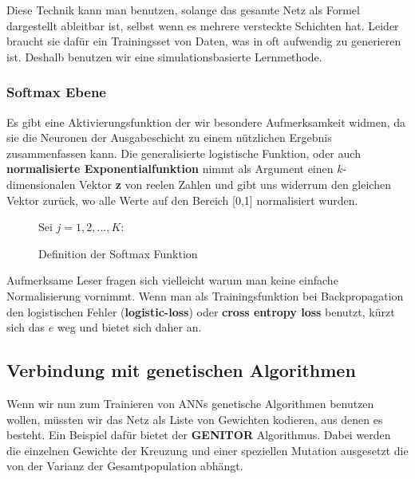                 \noindent
                Diese Technik kann man benutzen, solange das gesamte Netz als Formel dargestellt ableitbar ist, selbst wenn es mehrere versteckte Schichten hat. Leider braucht sie dafür ein Trainingsset von Daten, was in oft aufwendig zu generieren ist. Deshalb benutzen wir eine simulationsbasierte Lernmethode.


            \subsubsection*{Softmax Ebene}
                Es gibt eine Aktivierungsfunktion der wir besondere Aufmerksamkeit widmen, da sie die Neuronen der Ausgabeschicht zu einem nützlichen Ergebnis zusammenfassen kann. Die generalisierte logistische Funktion, oder auch \textbf{normalisierte Exponentialfunktion} nimmt als Argument einen $k$-dimensionalen Vektor \textbf{z} von reelen Zahlen und gibt uns widerrum den gleichen Vektor zurück, wo alle Werte auf den Bereich [0,1] normalisiert wurden.

            \begin{figure}[H]
                \begin{mdframed}
                    Sei $j = 1,2,...,K$: \\
                    \hspace*{45mm} 
                \end{mdframed}
                \caption{\label{softmax} Definition der Softmax Funktion}
            \end{figure}

            \noindent
            Aufmerksame Leser fragen sich vielleicht warum man keine einfache Normalisierung vornimmt. Wenn man als Trainingsfunktion bei Backpropagation den logistischen Fehler (\textbf{logistic-loss}) oder \textbf{cross entropy loss} benutzt, kürzt sich das $e$ weg und bietet sich daher an.

        \subsection{Verbindung mit genetischen Algorithmen}
            Wenn wir nun zum Trainieren von ANNs genetische Algorithmen benutzen wollen, müssten wir das Netz als Liste von Gewichten kodieren, aus denen es besteht. Ein Beispiel dafür bietet der \textbf{GENITOR}\cite{moriarty1999evolutionary} Algorithmus. Dabei werden die einzelnen Gewichte der Kreuzung und einer speziellen Mutation ausgesetzt die von der Varianz der Gesamtpopulation abhängt. \\

